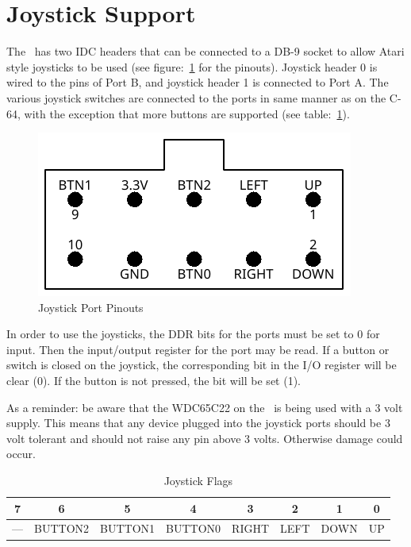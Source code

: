 \section*{Joystick Support}

The \jr\ has two IDC headers that can be connected to a DB-9 socket to allow Atari style joysticks to be used (see figure:~\ref{fig:joystick_ports} for the pinouts). Joystick header 0 is wired to the pins of Port B, and joystick header 1 is connected to Port A. The various joystick switches are connected to the ports in same manner as on the C-64, with the exception that more buttons are supported (see table:~\ref{tab:via_joystick}).

\begin{figure}[ht]
    \begin{center}
        \includegraphics{images/f256jr_joystick_pinout.pdf}
    \end{center}
    \caption{Joystick Port Pinouts}
    \label{fig:joystick_ports}
\end{figure}

In order to use the joysticks, the DDR bits for the ports must be set to 0 for input. Then the input/output register for the port may be read. If a button or switch is closed on the joystick, the corresponding bit in the I/O register will be clear (0). If the button is not pressed, the bit will be set (1).

As a reminder: be aware that the WDC65C22 on the \jr\ is being used with a 3 volt supply. This means that any device plugged into the joystick ports should be 3 volt tolerant and should not raise any pin above 3 volts. Otherwise damage could occur.

\begin{table}[ht]
    \begin{center}
        \begin{tabular}{|c|c|c|c|c|c|c|c|} \hline
            7 & 6 & 5 & 4 & 3 & 2 & 1 & 0 \\\hline\hline
            --- & BUTTON2 & BUTTON1 & BUTTON0 & RIGHT & LEFT & DOWN & UP \\ \hline
        \end{tabular}
    \end{center}
    \caption{Joystick Flags}
    \label{tab:via_joystick}
\end{table}

